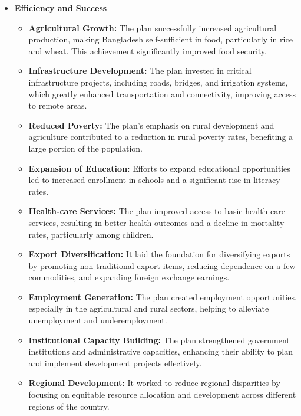 \begin{itemize}
	\item\textbf{Efficiency and Success}
	\begin{itemize}
		\item\textbf{Agricultural Growth: } The plan successfully increased agricultural production, 
		making Bangladesh self-sufficient in food, particularly in rice and wheat. This achievement 
		significantly improved food security.
		\item\textbf{Infrastructure Development: } The plan invested in critical infrastructure projects, 
		including roads, bridges, and irrigation systems, which greatly enhanced transportation and connectivity, 
		improving access to remote areas.
		\item\textbf{Reduced Poverty: } The plan's emphasis on rural development and agriculture 
		contributed to a reduction in rural poverty rates, benefiting a large portion of the population.
		\item\textbf{Expansion of Education: } Efforts to expand educational opportunities led to 
		increased enrollment in schools and a significant rise in literacy rates.
		\item\textbf{Health-care Services: } The plan improved access to basic health-care services, 
		resulting in better health outcomes and a decline in mortality rates, particularly among children.
		\item\textbf{Export Diversification: } It laid the foundation for diversifying exports by promoting 
		non-traditional export items, reducing dependence on a few commodities, and expanding foreign exchange earnings.
		\item\textbf{Employment Generation: } The plan created employment opportunities, especially in the 
		agricultural and rural sectors, helping to alleviate unemployment and underemployment.
		\item\textbf{Institutional Capacity Building: } The plan strengthened government institutions and 
		administrative capacities, enhancing their ability to plan and implement development projects effectively.
		\item\textbf{Regional Development: } It worked to reduce regional disparities 
		by focusing on equitable resource allocation and development across different regions of the country.
	\end{itemize}
	

\end{itemize}
